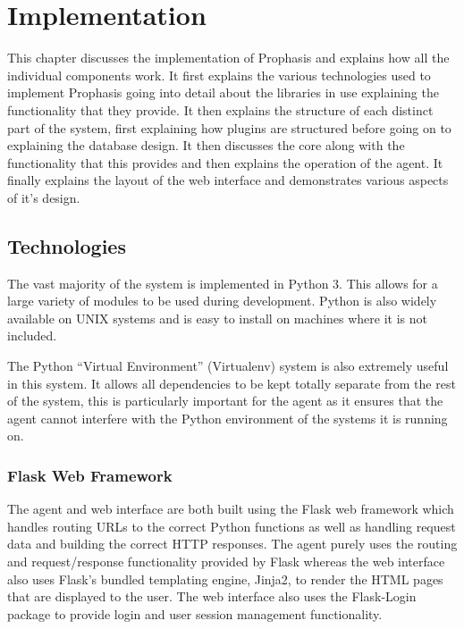 \documentclass[bsc,deptreport,twoside,parskip,singlespacing,notimes]{infthesis}
\begin{document}
\chapter{Implementation}
	This chapter discusses the implementation of Prophasis and explains how all the
	individual components work.  It first explains the various technologies used to
	implement Prophasis going into detail about the libraries in use explaining
	the functionality that they provide.  It then explains the structure of each
	distinct part of the system, first explaining how plugins are structured before
	going on to explaining the database design.  It then discusses the core along
	with the functionality that this provides and then explains the operation of
	the agent. It finally explains the layout of the web interface and demonstrates
	various aspects of it's design.

\section{Technologies}

	The vast majority of the system is implemented in Python 3.  This allows for a
	large variety of modules to be used during development. Python is also widely
	available on UNIX systems and is easy to install on machines where it is not
	included.


	The Python ``Virtual Environment'' (Virtualenv) system is also extremely useful
	in this system.  It allows all dependencies to be kept totally separate from
	the rest of the system, this is particularly important for the agent as it
	ensures that the agent cannot interfere with the Python environment of the
	systems it is running on.

\subsection{Flask Web Framework}

	The agent and web interface are both built using the Flask web framework which
	handles routing URLs to the correct Python functions as well as handling
	request data and building the correct HTTP responses. The agent purely uses the
	routing and request/response functionality provided by Flask whereas the web
	interface also uses Flask's bundled templating engine, Jinja2, to render the
	HTML pages that are displayed to the user. The web interface also uses the
	Flask-Login package to provide login and user session management functionality.
\end{document}
